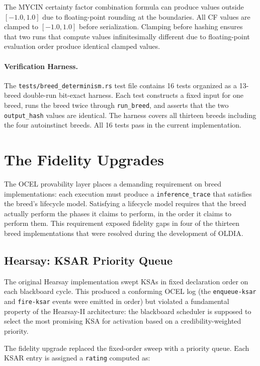 The MYCIN certainty factor combination formula can produce values outside $[-1.0, 1.0]$ due to floating-point rounding at the boundaries. All CF values are clamped to $[-1.0, 1.0]$ before serialization. Clamping before hashing ensures that two runs that compute values infinitesimally different due to floating-point evaluation order produce identical clamped values.

\paragraph{Verification Harness.}

The \texttt{tests/breed\_determinism.rs} test file contains 16 tests organized as a 13-breed double-run bit-exact harness. Each test constructs a fixed input for one breed, runs the breed twice through \texttt{run\_breed}, and asserts that the two \texttt{output\_hash} values are identical. The harness covers all thirteen breeds including the four autoinstinct breeds. All 16 tests pass in the current implementation.

\section{The Fidelity Upgrades}
\label{sec:fidelity-upgrades}

The OCEL provability layer places a demanding requirement on breed implementations: each execution must produce a \texttt{inference\_trace} that satisfies the breed's lifecycle model. Satisfying a lifecycle model requires that the breed actually perform the phases it claims to perform, in the order it claims to perform them. This requirement exposed fidelity gaps in four of the thirteen breed implementations that were resolved during the development of OLDIA.

\subsection{Hearsay: KSAR Priority Queue}

The original Hearsay implementation swept KSAs in fixed declaration order on each blackboard cycle. This produced a conforming OCEL log (the \texttt{enqueue-ksar} and \texttt{fire-ksar} events were emitted in order) but violated a fundamental property of the Hearsay-II architecture: the blackboard scheduler is supposed to select the most promising KSA for activation based on a credibility-weighted priority.

The fidelity upgrade replaced the fixed-order sweep with a priority queue. Each KSAR entry is assigned a \texttt{rating} computed as:


